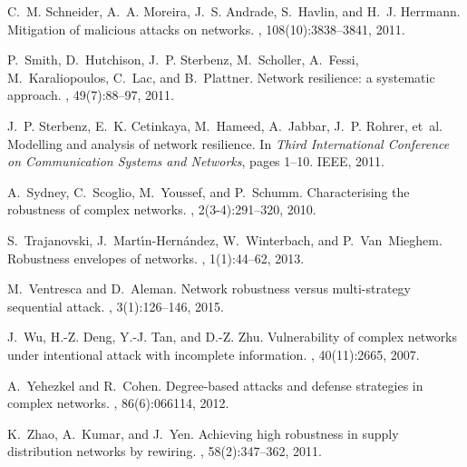 \documentclass{sig-alternate-10pt}
\begin{document}
\begin{thebibliography}{10}
C.~M. Schneider, A.~A. Moreira, J.~S. Andrade, S.~Havlin, and H.~J. Herrmann.
\newblock Mitigation of malicious attacks on networks.
,
  108(10):3838--3841, 2011.

P.~Smith, D.~Hutchison, J.~P. Sterbenz, M.~Scholler, A.~Fessi,
  M.~Karaliopoulos, C.~Lac, and B.~Plattner.
\newblock Network resilience: a systematic approach.
, 49(7):88--97, 2011.

J.~P. Sterbenz, E.~K. Cetinkaya, M.~Hameed, A.~Jabbar, J.~P. Rohrer, et~al.
\newblock Modelling and analysis of network resilience.
\newblock In {\em Third International Conference on Communication Systems and
  Networks}, pages 1--10. IEEE, 2011.

A.~Sydney, C.~Scoglio, M.~Youssef, and P.~Schumm.
\newblock Characterising the robustness of complex networks.
, 2(3-4):291--320, 2010.

S.~Trajanovski, J.~Mart{\'\i}n-Hern{\'a}ndez, W.~Winterbach, and
  P.~Van~Mieghem.
\newblock Robustness envelopes of networks.
, 1(1):44--62, 2013.

M.~Ventresca and D.~Aleman.
\newblock Network robustness versus multi-strategy sequential attack.
, 3(1):126--146, 2015.

J.~Wu, H.-Z. Deng, Y.-J. Tan, and D.-Z. Zhu.
\newblock Vulnerability of complex networks under intentional attack with
  incomplete information.
,
  40(11):2665, 2007.

A.~Yehezkel and R.~Cohen.
\newblock Degree-based attacks and defense strategies in complex networks.
, 86(6):066114, 2012.

K.~Zhao, A.~Kumar, and J.~Yen.
\newblock Achieving high robustness in supply distribution networks by
  rewiring.
, 58(2):347--362,
  2011.

\end{thebibliography}
\end{document}
